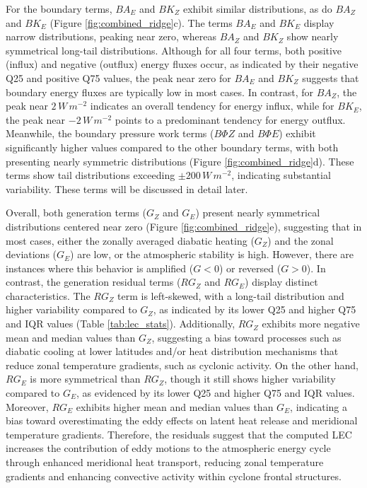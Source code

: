 \documentclass[pdflatex,sn-chicago]{sn-jnl}%
\theoremstyle{plain}
\theoremstyle{definition}
\theoremstyle{remark}
\theoremstyle{definition}
\begin{document}
For the boundary terms, $BA_E$ and $BK_Z$ exhibit similar distributions, as do $BA_Z$ and $BK_E$ (Figure \ref{fig:combined_ridge}c). The terms $BA_E$ and $BK_E$ display narrow distributions, peaking near zero, whereas $BA_Z$ and $BK_Z$ show nearly symmetrical long-tail distributions. Although for all four terms, both positive (influx) and negative (outflux) energy fluxes occur, as indicated by their negative Q25 and positive Q75 values, the peak near zero for $BA_E$ and $BK_Z$ suggests that boundary energy fluxes are typically low in most cases. In contrast, for $BA_Z$, the peak near $2 \, W \, m^{-2}$ indicates an overall tendency for energy influx, while for $BK_E$, the peak near $-2 \, W \, m^{-2}$ points to a predominant tendency for energy outflux. Meanwhile, the boundary pressure work terms ($B\Phi Z$ and $B\Phi E$) exhibit significantly higher values compared to the other boundary terms, with both presenting nearly symmetric distributions (Figure \ref{fig:combined_ridge}d). These terms show tail distributions exceeding $\pm 200 \, W \, m^{-2}$, indicating substantial variability. These terms will be discussed in detail later.

Overall, both generation terms ($G_Z$ and $G_E$) present nearly symmetrical distributions centered near zero (Figure \ref{fig:combined_ridge}e), suggesting that in most cases, either the zonally averaged diabatic heating ($G_Z$) and the zonal deviations ($G_E$) are low, or the atmospheric stability is high. However, there are instances where this behavior is amplified ($G < 0$) or reversed ($G > 0$). In contrast, the generation residual terms ($RG_Z$ and $RG_E$) display distinct characteristics. The $RG_Z$ term is left-skewed, with a long-tail distribution and higher variability compared to $G_Z$, as indicated by its lower Q25 and higher Q75 and IQR values (Table \ref{tab:lec_stats}). Additionally, $RG_Z$ exhibits more negative mean and median values than $G_Z$, suggesting a bias toward processes such as diabatic cooling at lower latitudes and/or heat distribution mechanisms that reduce zonal temperature gradients, such as cyclonic activity. On the other hand, $RG_E$ is more symmetrical than $RG_Z$, though it still shows higher variability compared to $G_E$, as evidenced by its lower Q25 and higher Q75 and IQR values. Moreover, $RG_E$ exhibits higher mean and median values than $G_E$, indicating a bias toward overestimating the eddy effects on latent heat release and meridional temperature gradients. Therefore, the residuals suggest that the computed LEC increases the contribution of eddy motions to the atmospheric energy cycle through enhanced meridional heat transport, reducing zonal temperature gradients and enhancing convective activity within cyclone frontal structures.
\end{document}
